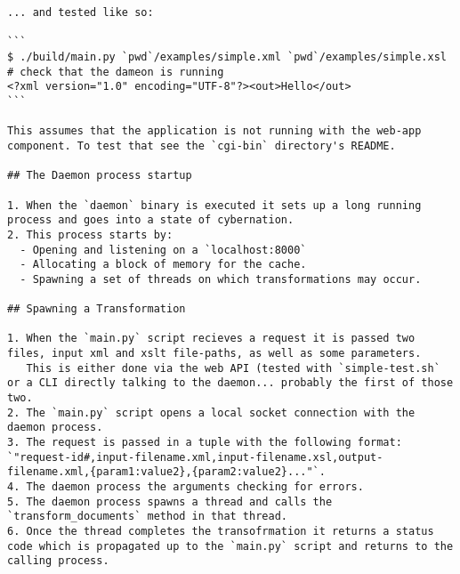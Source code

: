 \begin{lstlisting}
... and tested like so:

```
$ ./build/main.py `pwd`/examples/simple.xml `pwd`/examples/simple.xsl # check that the dameon is running
<?xml version="1.0" encoding="UTF-8"?><out>Hello</out>
```

This assumes that the application is not running with the web-app component. To test that see the `cgi-bin` directory's README.

## The Daemon process startup

1. When the `daemon` binary is executed it sets up a long running process and goes into a state of cybernation.
2. This process starts by:
  - Opening and listening on a `localhost:8000`
  - Allocating a block of memory for the cache.
  - Spawning a set of threads on which transformations may occur.

## Spawning a Transformation

1. When the `main.py` script recieves a request it is passed two files, input xml and xslt file-paths, as well as some parameters.
   This is either done via the web API (tested with `simple-test.sh` or a CLI directly talking to the daemon... probably the first of those two.
2. The `main.py` script opens a local socket connection with the daemon process.
3. The request is passed in a tuple with the following format: `"request-id#,input-filename.xml,input-filename.xsl,output-filename.xml,{param1:value2},{param2:value2}..."`.
4. The daemon process the arguments checking for errors.
5. The daemon process spawns a thread and calls the `transform_documents` method in that thread.
6. Once the thread completes the transofrmation it returns a status code which is propagated up to the `main.py` script and returns to the calling process.
\end{lstlisting}

